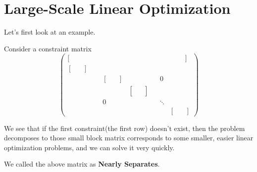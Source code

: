 \chapter{Large-Scale Linear Optimization}

Let's first look at an example.
\begin{eg}
	Consider a constraint matrix
	\[
		\left(\begin{array}{cccccc}
				[\quad\quad\quad\quad                            &                                              &                                                        &  &        & \quad\ \quad]                                     \\
				\left[\begin{array}{cc} & \\ &\end{array}\right] &                                              &                                                        &  &        &                                                   \\
				                                                 & \left[\begin{array}{cc} & \end{array}\right] &                                                        &  & 0      &                                                   \\
				                                                 &                                              & \left[\begin{array}{cc} & \\ & \\ & \end{array}\right] &  &        &                                                   \\
				                                                 & 0                                            &                                                        &  & \ddots                                                     \\
				                                                 &                                              &                                                        &  &        & \left[\begin{array}{cc} & \\ & \end{array}\right]
			\end{array}\right)
	\]

	We see that if the first constraint(the first row) doesn't exist, then the problem decomposes to
	those small block matrix corresponds to some smaller, easier linear optimization problems, and we can solve it very quickly.

	\begin{note}
		We called the above matrix as \textbf{Nearly Separates}.
	\end{note}
\end{eg}

